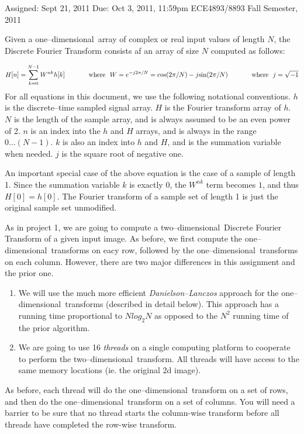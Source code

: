 \documentclass[10pt]{article}
\begin{document}
{Assigned: Sept 21, 2011}
{Due: Oct 3, 2011, 11:59pm}
{ECE4893/8893}
{Fall Semester, 2011}

\def\td{two--dimensional}
\def\od{one--dimensional}
Given a \od\ array of complex or real input values of length $N$,
the Discrete Fourier Transform consists af an array of size $N$ computed
as follows:

\begin{equation}
\label{Eq:DFT}
H[n] = \sum_{k=0}^{N-1} W^{nk}h[k]
\hspace{0.5in}\mbox{where}\ \ 
W = e^{-j2\pi/N} = \mbox{cos}(2\pi/N)-j\mbox{sin}(2\pi/N)
\hspace{0.5in}\mbox{where}\ \ 
j = \sqrt{-1}
\end{equation}
For all equations in this document, we use the following notational
conventions.
$h$ is the discrete--time sampled signal array.
$H$ is the Fourier transform array of $h$. 
$N$ is the length of the sample array, and is always
assumed to be an even power of 2.
$n$ is an index into the $h$ and $H$ arrays, and is always in the
range $0 \ldots (N-1)$.
$k$ is also an index into $h$ and $H$, and is the summation
variable when needed.
$j$ is the square root of negative one.

An important special case of the above equation is the case of a
sample of length 1.  Since the summation variable $k$ is exactly
$0$, the $W^{nk}$ term becomes $1$, and thus $H[0] = h[0]$.  The
Fourier transform of a sample set of length 1 is just the original
sample set unmodified.

As in project 1, we are going to compute a \td\ Discrete Fourier
Transform of a given input image.  As before, we first compute the
\od\ transforms on eacy row, followed by the \od\ transforms on each
column.  However, there are two major differences in this assignment
and the prior one.

\begin{enumerate}
\item We will use the much more efficient {\em Danielson--Lanczos}
approach for the \od\ transforms (described in detail below).
This approach has a running time proportional to $N log_2 N$ as
opposed to the $N^2$ running time of the prior algorithm.
\item We are going to use 16 {\em threads} on a single computing
platform to cooperate to perform the \td\ transform.  All threads will
have access to the same memory locations (ie. the original 2d
image).
\end{enumerate}
As before, each thread will do the \od\ transform on a set of rows,
and then do the \od\ transform on a set of columns.  You will
need a barrier to be sure that no thread starts the column-wise
transform before all threads have completed the row-wise transform.
\end{document}
